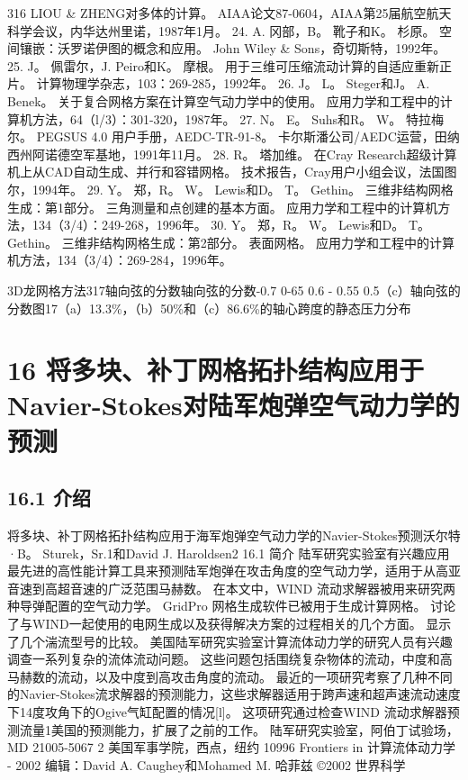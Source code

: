 \documentclass[UTF8,11pt,a4paper,openany,fontset=fandol]{ctexbook}
\begin{document}
316 LIOU \& ZHENG对多体的计算。 AIAA论文87-0604，AIAA第25届航空航天科学会议，内华达州里诺，1987年1月。 24. A. 冈部，B。 靴子和K。 杉原。 空间镶嵌：沃罗诺伊图的概念和应用。 John Wiley \& Sons，奇切斯特，1992年。 25. J。 佩雷尔，J. Peiro和K。 摩根。 用于三维可压缩流动计算的自适应重新正片。 计算物理学杂志，103：269-285，1992年。 26. J。 L。 Steger和J。 A. Benek。 关于复合网格方案在计算空气动力学中的使用。 应用力学和工程中的计算机方法，64（l/3）：301-320，1987年。 27. N。 E。 Suhs和R。 W。 特拉梅尔。 PEGSUS 4.0 用户手册，AEDC-TR-91-8。 卡尔斯潘公司/AEDC运营，田纳西州阿诺德空军基地，1991年11月。 28. R。 塔加维。 在Cray Research超级计算机上从CAD自动生成、并行和容错网格。 技术报告，Cray用户小组会议，法国图尔，1994年。 29. Y。 郑，R。 W。 Lewis和D。 T。 Gethin。 三维非结构网格生成：第1部分。 三角测量和点创建的基本方面。 应用力学和工程中的计算机方法，134（3/4）：249-268，1996年。 30. Y。 郑，R。 W。 Lewis和D。 T。 Gethin。 三维非结构网格生成：第2部分。 表面网格。 应用力学和工程中的计算机方法，134（3/4）：269-284，1996年。

3D龙网格方法317轴向弦的分数轴向弦的分数-0.7 0-65 0.6 - 0.55 0.5（c）轴向弦的分数图17（a）13.3\%，（b）50\%和（c）86.6\%的轴心跨度的静态压力分布

\clearpage
\chapter{16 将多块、补丁网格拓扑结构应用于Navier-Stokes对陆军炮弹空气动力学的预测}
\section{16.1 介绍}
将多块、补丁网格拓扑结构应用于海军炮弹空气动力学的Navier-Stokes预测沃尔特·B。 Sturek，Sr.1和David J. Haroldsen2 16.1 简介 陆军研究实验室有兴趣应用最先进的高性能计算工具来预测陆军炮弹在攻击角度的空气动力学，适用于从高亚音速到高超音速的广泛范围马赫数。 在本文中，WIND 流动求解器被用来研究两种导弹配置的空气动力学。 GridPro 网格生成软件已被用于生成计算网格。 讨论了与WIND一起使用的电网生成以及获得解决方案的过程相关的几个方面。 显示了几个湍流型号的比较。 美国陆军研究实验室计算流体动力学的研究人员有兴趣调查一系列复杂的流体流动问题。 这些问题包括围绕复杂物体的流动，中度和高马赫数的流动，以及中度到高攻击角度的流动。 最近的一项研究考察了几种不同的Navier-Stokes流求解器的预测能力，这些求解器适用于跨声速和超声速流动速度下14度攻角下的Ogive气缸配置的情况[l]。 这项研究通过检查WIND 流动求解器预测流量1美国的预测能力，扩展了之前的工作。 陆军研究实验室，阿伯丁试验场，MD 21005-5067 2 美国军事学院，西点，纽约 10996 Frontiers in 计算流体动力学 - 2002 编辑：David A. Caughey和Mohamed M. 哈菲兹 ©2002 世界科学
\end{document}
